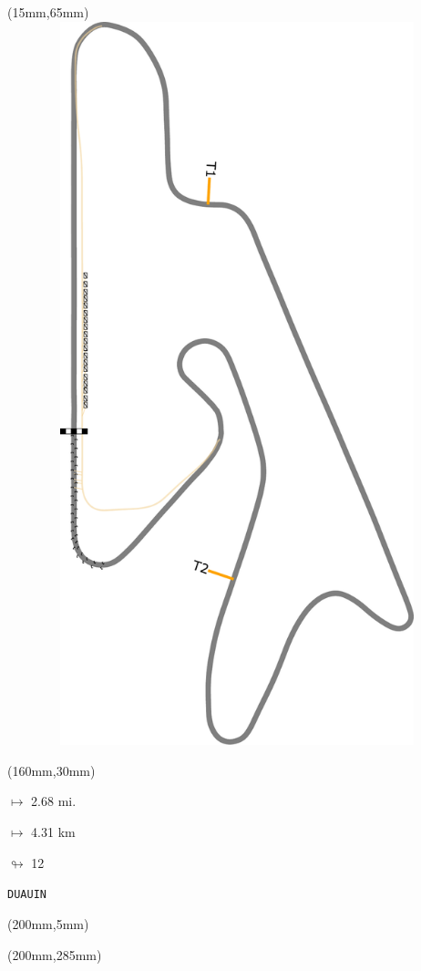 \begin{textblock*}{185mm}(15mm,65mm)%
\centering
\mbox{\includegraphics[width=185mm,height=210mm,keepaspectratio]{PT/DUAUIN.pdf}}
\end{textblock*}
\begin{textblock*}{40mm}(160mm,30mm)%
\Large
\par$\mapsto$ 2.68 mi.
\par$\mapsto$ 4.31 km
\par$\looparrowright$ 12
\par\hfill\tiny\tt DUAUIN\\
\end{textblock*}
\begin{textblock*}{20mm}(200mm,5mm)%
\fbox{\thepage}
\label{DUAUIN}
\end{textblock*}
\begin{textblock*}{20mm}(200mm,285mm)%
\fbox{\thepage}
\end{textblock*}


